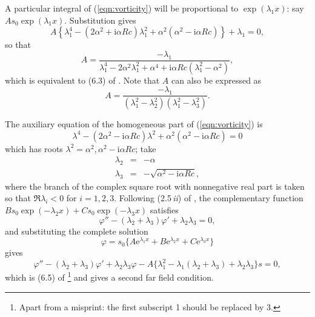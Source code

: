 \documentclass{article}
\begin{document}
A particular integral of (\ref{eqn:vorticity}) will be proportional to
$\exp(\lambda_1 x)$: say $A s_0 \exp(\lambda_1 x)$.  Substitution
gives
\begin{equation}
A\left\{ \lambda_1^4 -(2\alpha^2+\mathrm{i}\alpha R c)\lambda_1^2
+\alpha^2(\alpha^2-\mathrm{i}\alpha R c)\right\} 
+ \lambda_1 = 0,
\end{equation}
so that
\begin{equation}
A = \frac{-\lambda_1}
{\lambda_1^4 -2\alpha^2\lambda_1^2+\alpha^4 + 
\mathrm{i} \alpha R c (\lambda_1^2 - \alpha^2)},
\end{equation}
which is equivalent to (6.3) of \citet{Daniels97:JFM-335-57}.  Note that
$A$ can also be expressed as
\begin{equation}
A =
\frac{-\lambda_1}{(\lambda_1^2-\lambda_2^2)(\lambda_1^2-\lambda_3^2)}.
\end{equation}

The auxiliary equation of the homogeneous part of
(\ref{eqn:vorticity}) is
\begin{equation}
\lambda^4 - (2\alpha^2-\mathrm{i}\alpha R c)\lambda^2
+\alpha^2(\alpha^2 - \mathrm{i}\alpha R c) = 0
\end{equation}
which has roots $\lambda^2=\alpha^2, \alpha^2-\mathrm{i}\alpha R c$;
take
\begin{eqnarray}
\lambda_2 & = & -\alpha\label{eqn:lambda_2} \\
\lambda_3 & = & -\sqrt{\alpha^2-\mathrm{i}\alpha R c},
\label{eqn:lambda_3}
\end{eqnarray}
where the branch of the complex square root with nonnegative real part
is taken so that $\Re{\lambda_i}<0$ for $i=1,2,3$.  Following
(2.5\,\textit{ii}) of \citet{Gill69:JFM-35-775}, the complementary
function $B s_0 \exp(-\lambda_2 x) + C s_0 \exp(-\lambda_3 x)$
satisfies
\begin{equation}
\varphi'' - (\lambda_2 + \lambda_3)\varphi' + \lambda_2 \lambda_3 = 0,
\end{equation}
and substituting the complete solution 
\begin{equation}
\varphi = s_0 \{A\mathrm{e}^{\lambda_1 x} + B\mathrm{e}^{\lambda_2 x} +
C\mathrm{e}^{\lambda_3 x}\}
\end{equation}
gives
\begin{equation}
\varphi'' - (\lambda_2 + \lambda_3)\varphi' + \lambda_2 \lambda_3 \varphi
- A \{\lambda_1^2 - \lambda_1 (\lambda_2 + \lambda_3) +
\lambda_2\lambda_3\} s = 0,\label{eqn:second_ffc}
\end{equation}
which is (6.5) of \citet{Daniels97:JFM-335-57}\footnote{Apart from a
misprint: the first subscript 1 should be replaced by 3.} and gives a
second far field condition.
\end{document}
